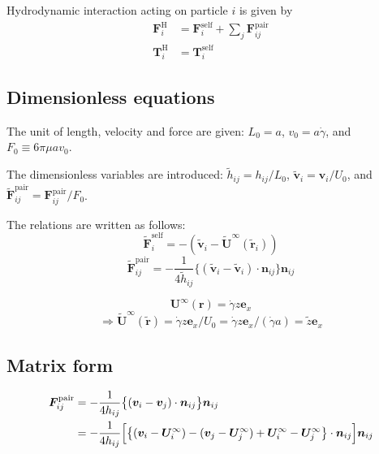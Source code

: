 \documentclass[12pt]{article}
\begin{document}
Hydrodynamic interaction acting on particle $i$
is given by
\begin{align}
\bm{F}_i^{\mathrm{H}}
&=
\bm{F}_i^{\mathrm{self}}
+
\sum_j
\bm{F}_{ij}^{\mathrm{pair}} \\
\bm{T}_i^{\mathrm{H}}
&=
\bm{T}_i^{\mathrm{self}}
\end{align}




\newpage
\subsection*{Dimensionless equations}

The unit of length, velocity and force 
are given:
$L_0 = a$,  $v_0 = a \dot{\gamma}$, and $F_0 \equiv 6 \pi \mu a v_0$.

The dimensionless variables are introduced:
$\tilde{h}_{ij} = h_{ij} / L_0$,
$\tilde{\bm{v}}_i = \bm{v}_i / U_0$,
and $\tilde{\bm{F}}_{ij}^{\mathrm{pair}} = \bm{F}_{ij}^{\mathrm{pair}} / F_0$.

The relations are written as follows:
\begin{equation}
 \tilde{\bm{F}}_i^{\mathrm{self}} = 
-( \tilde{\bm{v}}_i - 
\tilde{\bm{U}}^{\infty} 
(\tilde{\bm{r}}_i) )
\end{equation}
\begin{equation}
 \tilde{\bm{F}}_{ij}^{\mathrm{pair}}
= 
- \frac{1}{4 \tilde{h}_{ij}}
\bigl\{
(\tilde{\bm{v}}_i-
\tilde{\bm{v}}_i)\cdot
\bm{n}_{ij}
\bigr\}\bm{n}_{ij}
\end{equation}

\begin{equation}
 \bm{U}^{\infty}(\bm{r})
 = 
 \dot{\gamma} z \bm{e}_{x}
\end{equation}
\begin{equation}
\Longrightarrow
  \tilde{\bm{U}}^{\infty}(\tilde{\bm{r}})
 = 
 \dot{\gamma} z \bm{e}_{x} / U_0
=  \dot{\gamma} z \bm{e}_{x} / (\dot{\gamma} a)
= \tilde{z} \bm{e}_{x} 
\end{equation}


\newpage
\subsection*{Matrix form}
\begin{align}
 \bm{F}_{ij}^{\mathrm{pair}}
&= 
- \frac{1}{4 h_{ij}}
\bigl\{
(\bm{v}_i-
\bm{v}_j)\cdot
\bm{n}_{ij}
\bigr\}\bm{n}_{ij} \\
&=
- \frac{1}{4 h_{ij}}
\Bigl[
\bigl\{
(\bm{v}_i- \bm{U}^{\infty}_i)-
(\bm{v}_j- \bm{U}^{\infty}_j)
+ \bm{U}^{\infty}_i 
- \bm{U}^{\infty}_j
\bigr\}\cdot
\bm{n}_{ij}
\Bigr]
\bm{n}_{ij}
\end{align}
\end{document}
